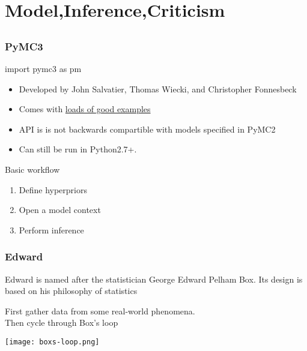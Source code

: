 \documentclass[table,dvipsnames]{beamer}
\newcommand{\highlt}{\textcolor{NavyBlue}}
\begin{document}
\section{Model,Inference,Criticism}
\subsection{}

\begin{frame}[fragile]
\frametitle{PyMC3}
\footnotesize
\begin{code}
import pymc3 as pm
\end{code}

\begin{itemize}
 \item Developed by John Salvatier, Thomas Wiecki, and Christopher Fonnesbeck \citep{Salvatier16}
 \item Comes with \href{https://github.com/pymc-devs/pymc3/tree/master/pymc3/examples}{loads of good examples}
 \item API is is not backwards compartible with models specified in PyMC2
 \item Can still be run in Python2.7+.
\end{itemize}

\highlt{Basic workflow}
\begin{enumerate}
 \item Define hyperpriors
 \item Open a model context
 \item Perform inference
\end{enumerate}
\end{frame}

\begin{frame}[fragile]
\frametitle{Edward}
\footnotesize
\begin{block}{}
 Edward is named after the statistician \highlt{George Edward Pelham Box}. Its design is based on his philosophy of statistics
\end{block}
First gather data from some real-world phenomena. \ \\ 
Then cycle through \highlt{Box’s loop}
\begin{center}
\texttt{[image: boxs-loop.png]}
\end{center}
\citep{Tran16}
\end{frame}
\end{document}
